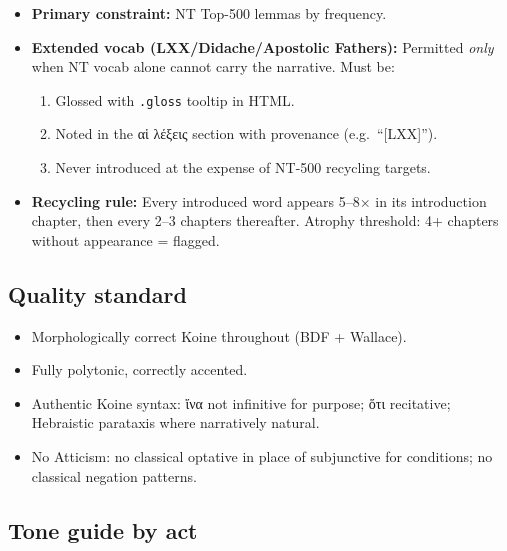 \documentclass[a4paper]{report}
\begin{document}
\begin{itemize}
\tightlist
\item
  \textbf{Primary constraint:} NT Top-500 lemmas by frequency.
\item
  \textbf{Extended vocab (LXX/Didache/Apostolic Fathers):} Permitted
  \emph{only} when NT vocab alone cannot carry the narrative. Must be:

  \begin{enumerate}
  \def\labelenumi{\arabic{enumi}.}
  \tightlist
  \item
    Glossed with \texttt{.gloss} tooltip in HTML.
  \item
    Noted in the αἱ λέξεις section with provenance (e.g.~``{[}LXX{]}'').
  \item
    Never introduced at the expense of NT-500 recycling targets.
  \end{enumerate}
\item
  \textbf{Recycling rule:} Every introduced word appears 5--8× in its
  introduction chapter, then every 2--3 chapters thereafter. Atrophy
  threshold: 4+ chapters without appearance = flagged.
\end{itemize}

\subsection{Quality standard}\label{quality-standard}

\begin{itemize}
\tightlist
\item
  Morphologically correct Koine throughout (BDF + Wallace).
\item
  Fully polytonic, correctly accented.
\item
  Authentic Koine syntax: ἵνα not infinitive for purpose; ὅτι
  recitative; Hebraistic parataxis where narratively natural.
\item
  No Atticism: no classical optative in place of subjunctive for
  conditions; no classical negation patterns.
\end{itemize}

\subsection{Tone guide by act}\label{tone-guide-by-act}
\end{document}
